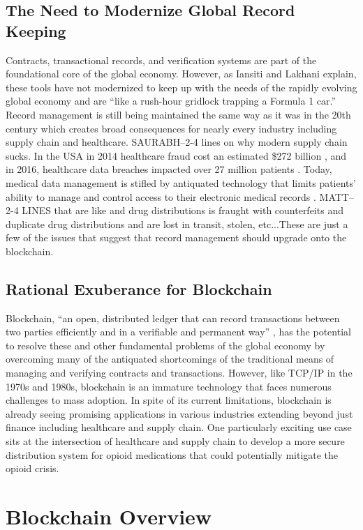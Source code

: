 \documentclass[sigconf]{acmart}
\begin{document}
\subsection{The Need to Modernize Global Record Keeping}
Contracts, transactional records, and verification systems are part of the foundational core of the global economy. However, as Iansiti and Lakhani \cite{hbr} explain, these tools have not modernized to keep up with the needs of the rapidly evolving global economy and are ``like a rush-hour gridlock trapping a Formula 1 car.'' Record management is still being maintained the same way as it was in the 20th century which creates broad consequences for nearly every industry including supply chain and healthcare. SAURABH--2-4 lines on why modern supply chain sucks. In the USA in 2014 healthcare fraud cost an estimated \$272 billion \cite{economist2014}, and in 2016, healthcare data breaches impacted over 27 million patients \cite{das2017}. Today, medical data management is stifled by antiquated technology that limits patients' ability to manage and control access to their electronic medical records \cite{ekblaw2016medrec}.  MATT--2-4 LINES that are like and drug distributions is fraught with counterfeits and duplicate drug distributions and are lost in transit, stolen, etc...These are just a few of the issues that suggest that record management should upgrade onto the blockchain.

\subsection{Rational Exuberance for Blockchain}
Blockchain, ``an open, distributed ledger that can record transactions between two parties efficiently and in a verifiable and permanent way'' \cite{hbr}, has the potential to resolve these and other fundamental problems of the global economy by overcoming many of the antiquated shortcomings of the traditional means of managing and verifying contracts and transactions. However, like TCP/IP in the 1970s and 1980s, blockchain is an immature technology that faces numerous challenges to mass adoption. In spite of its current limitations, blockchain is already seeing promising applications in various industries extending beyond just finance including healthcare and supply chain. One particularly exciting use case sits at the intersection of healthcare and supply chain to develop a more secure distribution system for opioid medications that could potentially mitigate the opioid crisis.

\section{Blockchain Overview}
\end{document}
